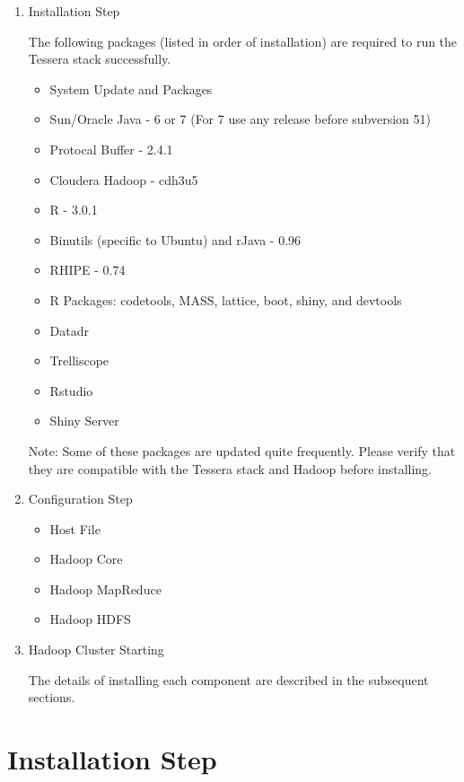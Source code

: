 \documentclass[11pt]{article}
\begin{document}
\begin{enumerate}
\item
  Installation Step
  
  The following packages (listed in order of
  installation) are required to run the Tessera stack successfully.

  \begin{itemize}
  \itemsep1pt\parskip0pt
  \item
    System Update and Packages
  \item
    Sun/Oracle Java - 6 or 7 (For 7 use any release before subversion
    51)
  \item
    Protocal Buffer - 2.4.1
  \item
    Cloudera Hadoop - cdh3u5
  \item
    R - 3.0.1
  \item
    Binutils (specific to Ubuntu) and rJava - 0.96
  \item
    RHIPE - 0.74
  \item
    R Packages: codetools, MASS, lattice, boot, shiny, and devtools
  \item
    Datadr
  \item
    Trelliscope
  \item
    Rstudio
  \item
    Shiny Server
  \end{itemize}

  Note: Some of these packages are updated quite frequently. Please
  verify that they are compatible with the Tessera stack and Hadoop
  before installing.
\item
  Configuration Step

  \begin{itemize}
  \itemsep1pt\parskip0pt
  \item
    Host File
  \item
    Hadoop Core
  \item
    Hadoop MapReduce
  \item
    Hadoop HDFS
  \end{itemize}
\item
  Hadoop Cluster Starting
  
  The details of installing each component are
  described in the subsequent sections.
\end{enumerate}

\section{Installation Step}
\end{document}
